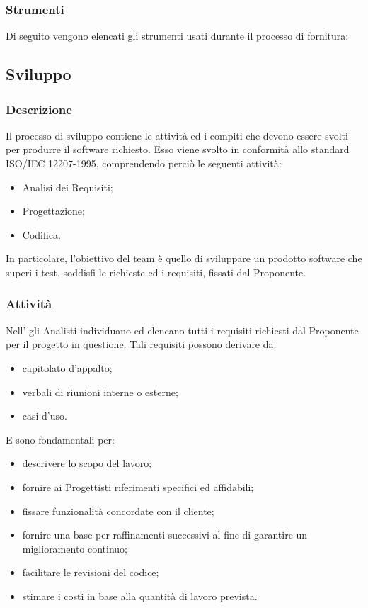         \subsubsection{Strumenti}
        Di seguito vengono elencati gli strumenti usati durante il processo di fornitura:
        
    \subsection{Sviluppo}
        \subsubsection{Descrizione}
        Il processo di sviluppo contiene le attività ed i compiti che devono essere svolti per produrre il software richiesto. Esso viene svolto in conformità allo standard ISO/IEC 12207-1995, comprendendo perciò le seguenti attività:
        \begin{itemize}
        \item{Analisi dei Requisiti;}
        \item{Progettazione;}
        \item{Codifica.}
        \end{itemize}
	In particolare, l'obiettivo del team è quello di sviluppare un prodotto software che superi i test, soddisfi le richieste ed i requisiti, fissati dal Proponente.
        
            \subsubsection{Attività}
           Nell'\AdR{} gli Analisti individuano ed elencano tutti i requisiti richiesti dal Proponente per il progetto in questione. Tali requisiti possono derivare da:
           \begin{itemize}
           	\item{capitolato d'appalto;}
		\item{verbali di riunioni interne o esterne;}
		\item{casi d'uso.}
           \end{itemize}
           E sono fondamentali per:
            \begin{itemize}
        		\item{descrivere lo scopo del lavoro;}
				\item{fornire ai Progettisti riferimenti specifici ed affidabili;}
				\item{fissare funzionalità concordate con il cliente;}
				\item{fornire una base per raffinamenti successivi al fine di garantire un miglioramento continuo;}
				\item{facilitare le revisioni del codice;}
				\item{stimare i costi in base alla quantità di lavoro prevista.}
        	\end{itemize}                 
                 
